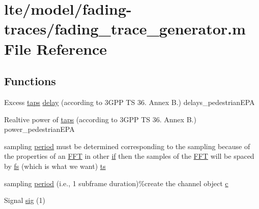 \hypertarget{lte_2model_2fading-traces_2fading__trace__generator_8m}{}\section{lte/model/fading-\/traces/fading\+\_\+trace\+\_\+generator.m File Reference}
\label{lte_2model_2fading-traces_2fading__trace__generator_8m}
\subsection*{Functions}
\begin{DoxyCompactItemize}
\item 
Excess \hyperlink{mmwave_2model_2fading-traces_2fading__trace__generator_8m_a36e13439e5ec878d93e3b760df348959}{taps} \hyperlink{lte_2model_2fading-traces_2fading__trace__generator_8m_a7964e6aa8f61a9d28973c8267a606ad8}{delay} (according to 3\+G\+P\+P T\+S 36. Annex B.) delays\+\_\+pedestrian\+E\+PA
\item 
Realtive power of \hyperlink{lte_2model_2fading-traces_2fading__trace__generator_8m_a36e13439e5ec878d93e3b760df348959}{taps} (according to 3\+G\+P\+P T\+S 36. Annex B.) power\+\_\+pedestrian\+E\+PA
\item 
sampling \hyperlink{mmwave_2model_2fading-traces_2fading__trace__generator_8m_ae10c944bf9f3fba2686a5885ecc192d7}{period} must be determined corresponding to the sampling because of the properties of an \hyperlink{mmwave_2model_2fading-traces_2fading__trace__generator_8m_ac4962f4e70dbd9d6f4994fd9698b6932}{F\+FT} in other \hyperlink{loss__OH__large__cities__urban_8m_ac77b6cfa3068152087725fe54b4ae8c8}{if} then the samples of the \hyperlink{mmwave_2model_2fading-traces_2fading__trace__generator_8m_ac4962f4e70dbd9d6f4994fd9698b6932}{F\+FT} will be spaced by \hyperlink{lte_2model_2fading-traces_2fading__trace__generator_8m_a828bad5070b721e1b73311b8607e5d25}{fs} (which is what we want) \hyperlink{mmwave_2model_2fading-traces_2fading__trace__generator_8m_ada841f58d7be618bfbc76c87e7d44086}{ts}
\item 
sampling \hyperlink{lte_2model_2fading-traces_2fading__trace__generator_8m_ae10c944bf9f3fba2686a5885ecc192d7}{period} (i.\+e., 1 subframe duration)\%create the channel object \hyperlink{mmwave_2model_2fading-traces_2fading__trace__generator_8m_ae0323a9039add2978bf5b49550572c7c}{c}
\item 
Signal \hyperlink{lte_2model_2fading-traces_2fading__trace__generator_8m_a9aeb058cb8f100cffa2c026e9ab5edf1}{sig} (1)
\end{DoxyCompactItemize}
